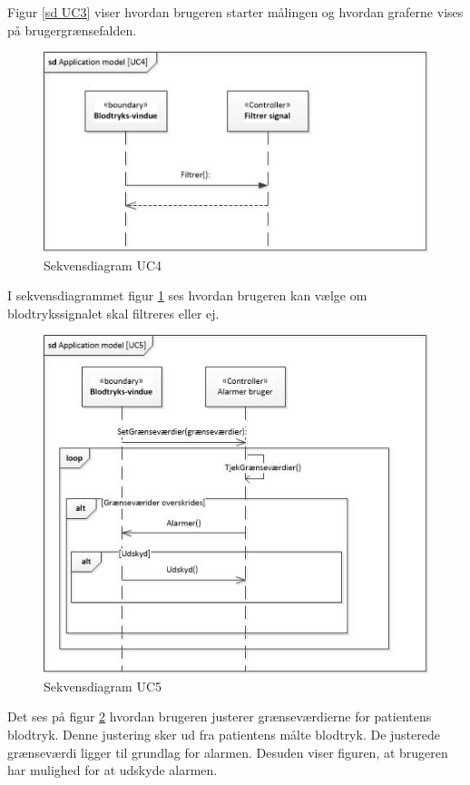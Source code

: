Figur \ref{sd UC3} viser hvordan brugeren starter målingen og hvordan graferne vises på brugergrænsefalden.

\begin{figure}[H]
	\includegraphics[width=1\textwidth]{Figurer/ISE/sdAppModelUC4}
	\caption{Sekvensdiagram UC4}
	\label{sd UC4}
\end{figure}

I sekvensdiagrammet figur \ref{sd UC4} ses hvordan brugeren kan vælge om blodtrykssignalet skal filtreres eller ej.

\begin{figure}[H]
	\includegraphics[width=1\textwidth]{Figurer/ISE/sdAppModelUC5}
	\caption{Sekvensdiagram UC5}
	\label{sd UC5}
\end{figure}

Det ses på figur \ref{sd UC5} hvordan brugeren justerer grænseværdierne for patientens blodtryk. Denne justering sker ud fra patientens målte blodtryk. De justerede grænseværdi ligger til grundlag for alarmen. Desuden viser figuren, at brugeren har mulighed for at udskyde alarmen.


